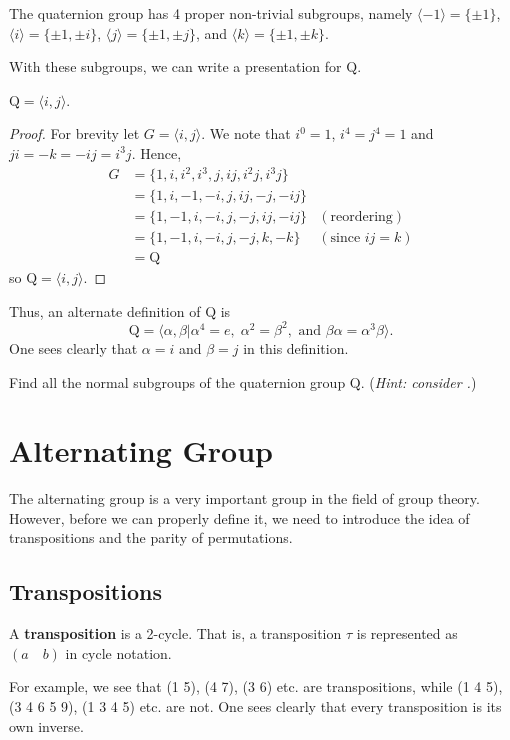The quaternion group has 4 proper non-trivial subgroups, namely $\langle -1 \rangle = \{\pm1\}$, $\langle i \rangle = \{\pm1, \pm i\}$, $\langle j \rangle = \{\pm1, \pm j\}$, and $\langle k \rangle = \{\pm1, \pm k\}$.

With these subgroups, we can write a presentation for $\mathrm{Q}$.
\begin{proposition}
    $\mathrm{Q} = \langle i, j \rangle$.
\end{proposition}
\begin{proof}
    For brevity let $G = \langle i, j \rangle$. We note that $i^0 = 1$, $i^4 = j^4 = 1$ and $ji = -k = -ij = i^3j$. Hence,
    \begin{align*}
        G &= \{1, i, i^2, i^3, j, ij, i^2j, i^3j\}\\
        &= \{1, i, -1, -i, j, ij, -j, -ij\}\\
        &= \{1, -1, i, -i, j, -j, ij, -ij\} & (\text{reordering})\\
        &= \{1, -1, i, -i, j, -j, k, -k\} & (\text{since } ij = k)\\
        &= \mathrm{Q}
    \end{align*}
    so $\mathrm{Q} = \langle i, j \rangle$.
\end{proof}

Thus, an alternate definition of $\mathrm{Q}$ is
\[
    \mathrm{Q} = \langle \alpha, \beta \vert \alpha^4 = e,\; \alpha^2 = \beta^2, \text{ and } \beta\alpha = \alpha^3\beta \rangle.
\]
One sees clearly that $\alpha = i$ and $\beta = j$ in this definition.

\begin{exercise}\label{exercise-normal-subgroups-of-quarternion-group}
    Find all the normal subgroups of the quaternion group $\mathrm{Q}$.\newline
    (\textit{Hint: consider .})
\end{exercise}

\section{Alternating Group}
The alternating group is a very important group in the field of group theory. However, before we can properly define it, we need to introduce the idea of transpositions and the parity of permutations.

\subsection{Transpositions}
\begin{definition}
    A \textbf{transposition} is a 2-cycle. That is, a transposition $\tau$ is represented as $(a\quad b)$ in cycle notation.
\end{definition}
For example, we see that (1 5), (4 7), (3 6) etc. are transpositions, while (1 4 5), (3 4 6 5 9), (1 3 4 5) etc. are not. One sees clearly that every transposition is its own inverse.

